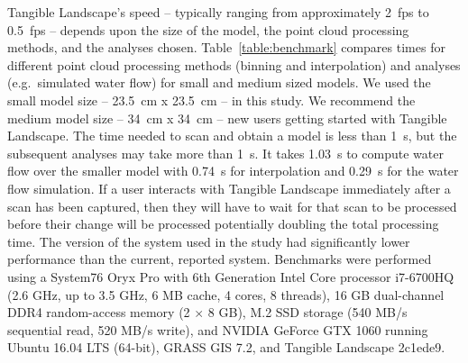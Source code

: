 \documentclass[prodmode,acmtochi]{acmsmall} %
\begin{document}
Tangible Landscape's speed 
-- typically ranging from approximately 2~fps to 0.5~fps -- 
depends upon the size of the model, 
the point cloud processing methods, 
and the analyses chosen. 
%
Table~\ref{table:benchmark} compares
times for different point cloud processing
methods (binning and interpolation) 
and analyses (e.g.~simulated water flow)
for small and medium sized models.
We used the small model size 
-- 23.5~cm x 23.5~cm --
in this study. 
We recommend the medium model size 
-- 34~cm x 34~cm --
new users getting started with Tangible Landscape.
%
The time needed to scan and obtain a model is less than 1~s, 
but the subsequent analyses may take more than 1~s.
It takes 1.03~s to
compute water flow over the smaller model 
with 0.74~s  for interpolation
and 0.29~s for the water flow simulation.
%
If a user interacts with Tangible Landscape 
immediately after a scan has been captured,
then they will have to wait for that scan to be processed
before their change will be processed
potentially doubling the total processing time.
%
The version of the system used in the study 
had significantly lower performance than
the current, reported system.
%
Benchmarks were performed using a
System76 Oryx Pro with
6th Generation Intel Core processor i7-6700HQ (2.6 GHz, up to 3.5 GHz, 6 MB cache, 4 cores, 8 threads),
16 GB dual-channel DDR4 random-access memory (2 $\times$ 8 GB),
M.2 SSD storage (540 MB/s sequential read, 520 MB/s write), and
NVIDIA GeForce GTX 1060
running Ubuntu 16.04 LTS (64-bit),
GRASS GIS 7.2, and
Tangible Landscape 2c1ede9.
%
\end{document}
